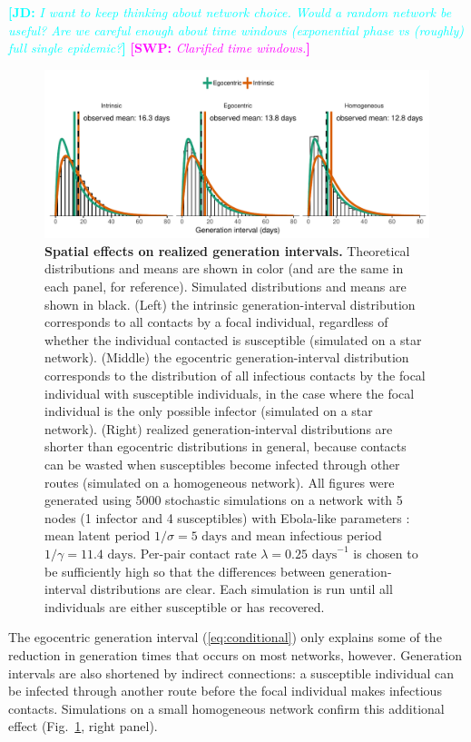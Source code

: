 \documentclass[12pt]{article}
\newcommand{\eref}[1]{(\ref{eq:#1})}
\newcommand{\fref}[1]{Fig.~\ref{fig:#1}}
\newcommand{\comment}[3]{\textcolor{#1}{\textbf{[#2: }\textsl{#3}\textbf{]}}}
\newcommand{\jd}[1]{\comment{cyan}{JD}{#1}}
\newcommand{\swp}[1]{\comment{magenta}{SWP}{#1}}
\begin{document}
\jd{I want to keep thinking about network choice. Would a random network be useful? Are we careful enough about time windows (exponential phase vs (roughly) full single epidemic?}
\swp{Clarified time windows.}
\begin{figure}[!pbth]
\includegraphics[width=\textwidth]{../fig/local_effect.pdf}
\caption{
\textbf{Spatial effects on realized generation intervals.}
Theoretical distributions and means are shown in color (and are the same in each panel, for reference). Simulated distributions and means are shown in black.
(Left) the intrinsic generation-interval distribution corresponds to all contacts by a focal individual, regardless of whether the individual contacted is susceptible (simulated on a star network).
(Middle) the egocentric generation-interval distribution corresponds to the distribution of all infectious contacts by the focal individual with susceptible individuals, in the case where the focal individual is the only possible infector (simulated on a star network).
(Right) realized generation-interval distributions are shorter than egocentric distributions in general, because contacts can be wasted when susceptibles become infected through other routes (simulated on a homogeneous network).
All figures were generated using 5000 stochastic simulations on a network with 5 nodes (1 infector and 4 susceptibles) with Ebola-like parameters \citep{who2014ebola}:
mean latent period $1/\sigma = 5 \textrm{ days}$ and mean infectious period $1/\gamma = 11.4 \textrm{ days}$. 
Per-pair contact rate $\lambda = 0.25 \textrm{ days}^{-1}$ is chosen to be sufficiently high so that the differences between generation-interval distributions are clear.
Each simulation is run until all individuals are either susceptible or has recovered.
}
\label{fig:local}
\end{figure}

The egocentric generation interval \eref{conditional} only explains some of the reduction in generation times that occurs on most networks, however.
Generation intervals are also shortened by indirect connections: a susceptible individual can be infected through another route before the focal individual makes infectious contacts.
Simulations on a small homogeneous network confirm this additional effect (\fref{local}, right panel). 
\end{document}
